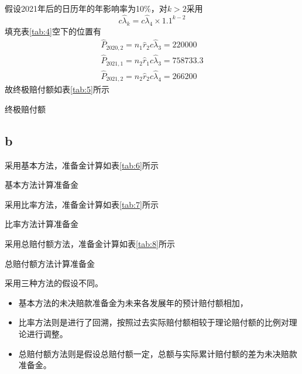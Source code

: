 \documentclass[a4paper,12pt]{ctexart}
\begin{document}
假设2021年后的日历年的年影响率为10\%，对$k>2$采用$$c\hat{\lambda}_k=c \hat\lambda_4 \times 1.1^{k-2}$$填充表\ref{tab:4}空下的位置有
\begin{eqnarray*}
    \hat P_{2020,2}=n_1\hat r_2c\hat\lambda_3=220000\\
    \hat P_{2021,1}=n_2\hat r_1c\hat\lambda_3=758733.3\\
    \hat P_{2021,2}=n_2\hat r_2c\hat\lambda_4=266200
\end{eqnarray*}
故终极赔付额如表\ref{tab:5}所示
\begin{table}[H]
    \centering
    \caption{终极赔付额}\label{tab:5}
\end{table}
\subsection*{b}
采用基本方法，准备金计算如表\ref{tab:6}所示
\begin{table}[H]
    \centering
    \caption{基本方法计算准备金}\label{tab:6}
\end{table}
采用比率方法，准备金计算如表\ref{tab:7}所示
\begin{table}[H]
    \centering
    \caption{比率方法计算准备金}\label{tab:7}
\end{table}
采用总赔付额方法，准备金计算如表\ref{tab:8}所示
\begin{table}[H]
    \centering
    \caption{总赔付额方法计算准备金}\label{tab:8}
\end{table}

采用三种方法的假设不同。
\begin{itemize}
\item 基本方法的未决赔款准备金为未来各发展年的预计赔付额相加，
\item 比率方法则是进行了回溯，按照过去实际赔付额相较于理论赔付额的比例对理论进行调整。
\item 总赔付额方法则是假设总赔付额一定，总额与实际累计赔付额的差为未决赔款准备金。
\end{itemize}
\end{document}

